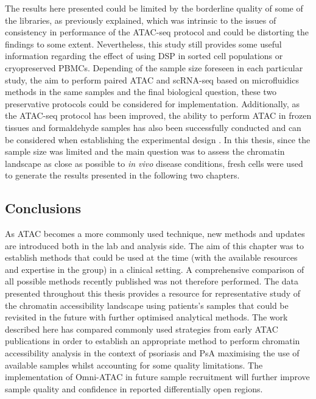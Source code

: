 The results here presented could be limited by the borderline quality of some of the libraries, as previously explained, which was intrinsic to the issues of consistency in performance of the ATAC-seq protocol and could be distorting the findings to some extent. Nevertheless, this study still provides some useful information regarding the effect of using DSP in sorted cell populations or cryopreserved PBMCs. Depending of the sample size foreseen in each particular study, the aim to perform paired ATAC and scRNA-seq based on microfluidics methods in the same samples and the final biological question, these two preservative protocols could be considered for implementation. Additionally, as the ATAC-seq protocol has been improved, the ability to perform ATAC in frozen tissues and formaldehyde samples has also been successfully conducted and can be considered when establishing the experimental design \parencite{Corces2017, Chen2016}. In this thesis, since the sample size was limited and the main question was to assess the chromatin landscape as close as possible to \textit{in vivo} disease conditions, fresh cells were used to generate the results presented in the following two chapters.

\subsection{Conclusions}
As ATAC becomes a more commonly used technique, new methods and updates are introduced both in the lab and analysis side. The aim of this chapter was to establish methods that could be used at the time (with the available resources and expertise in the group) in a clinical setting. A comprehensive comparison of all possible methods recently published was not therefore performed. The data presented throughout this thesis provides a resource for representative study of the chromatin accessibility landscape using patients's samples that could be revisited in the future with further optimised analytical methods. The work described here has compared commonly used strategies from early ATAC publications in order to establish an appropriate method to perform chromatin accessibility analysis in the context of psoriasis and PsA maximising the use of available samples whilst accounting for some quality limitations. The implementation of Omni-ATAC in future sample recruitment will further improve sample quality and confidence in reported differentially open regions.
